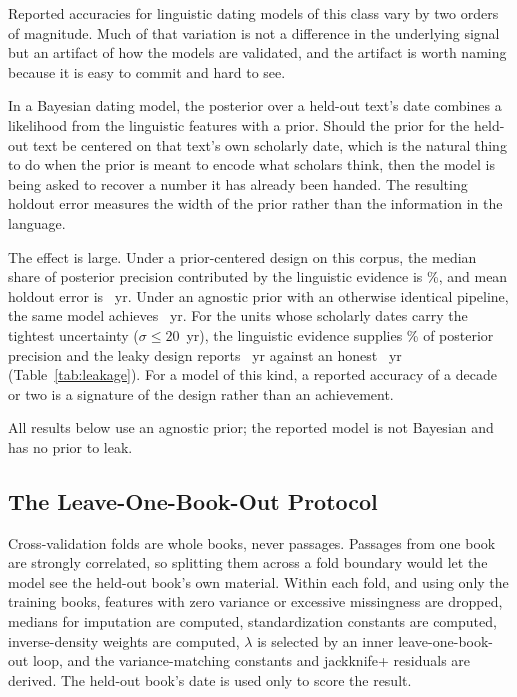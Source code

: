 \documentclass[10pt,letterpaper]{article}
\begin{document}
Reported accuracies for linguistic dating models of this class vary by two
orders of magnitude.  Much of that variation is not a difference in the
underlying signal but an artifact of how the models are validated, and the
artifact is worth naming because it is easy to commit and hard to see.

In a Bayesian dating model, the posterior over a held-out text's date combines
a likelihood from the linguistic features with a prior.  Should the prior for
the held-out text be centered on that text's own scholarly date, which is the
natural thing to do when the prior is meant to encode what scholars think, then
the model is being asked to recover a number it has already been handed.  The
resulting holdout error measures the width of the prior rather than the
information in the language.

The effect is large.  Under a prior-centered design on this corpus, the median
share of posterior precision contributed by the linguistic evidence is
\leakShare\%, and mean holdout error is \leakLeaky~yr.  Under an agnostic
prior with an otherwise identical pipeline, the same model achieves
\leakHonest~yr.  For the \leakTightN{} units whose scholarly dates carry the
tightest uncertainty ($\sigma \leq 20$~yr), the linguistic evidence supplies
\leakTightShare\% of posterior precision and the leaky design reports
\leakTightLeaky~yr against an honest \leakTightHonest~yr
(Table~\ref{tab:leakage}).  For a model of this kind, a reported accuracy of a
decade or two is a signature of the design rather than an achievement.



All results below use an agnostic prior; the reported model is not Bayesian
and has no prior to leak.

\subsection*{The Leave-One-Book-Out Protocol}

Cross-validation folds are whole books, never passages.  Passages from one book
are strongly correlated, so splitting them across a fold boundary would let the
model see the held-out book's own material.  Within each fold, and using only
the training books, features with zero variance or excessive missingness are
dropped, medians for imputation are computed, standardization constants are
computed, inverse-density weights are computed, $\lambda$ is selected by an
inner leave-one-book-out loop, and the variance-matching constants and
jackknife+ residuals are derived.  The held-out book's date is used only to
score the result.
\end{document}
